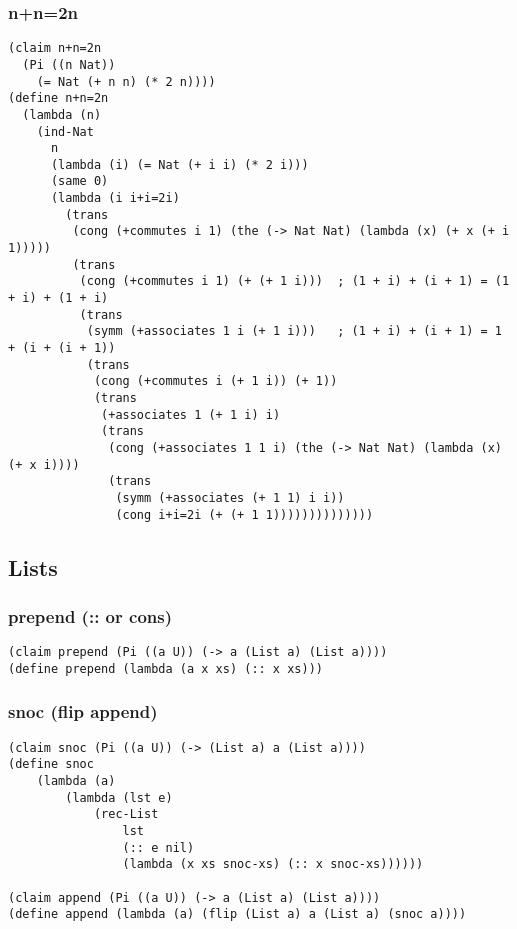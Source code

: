 \subsubsection{n+n=2n} \label{code:n+n=2n}
\begin{lstlisting}
(claim n+n=2n
  (Pi ((n Nat))
    (= Nat (+ n n) (* 2 n))))
(define n+n=2n
  (lambda (n)
    (ind-Nat
      n
      (lambda (i) (= Nat (+ i i) (* 2 i)))
      (same 0)
      (lambda (i i+i=2i)
        (trans
         (cong (+commutes i 1) (the (-> Nat Nat) (lambda (x) (+ x (+ i 1)))))
         (trans
          (cong (+commutes i 1) (+ (+ 1 i)))  ; (1 + i) + (i + 1) = (1 + i) + (1 + i)
          (trans
           (symm (+associates 1 i (+ 1 i)))   ; (1 + i) + (i + 1) = 1 + (i + (i + 1))
           (trans
            (cong (+commutes i (+ 1 i)) (+ 1))
            (trans
             (+associates 1 (+ 1 i) i)
             (trans
              (cong (+associates 1 1 i) (the (-> Nat Nat) (lambda (x) (+ x i))))
              (trans
               (symm (+associates (+ 1 1) i i))
               (cong i+i=2i (+ (+ 1 1))))))))))))))
\end{lstlisting}


\subsection{Lists}

\subsubsection{prepend (:: or cons)} \label{code:prepend}
\begin{lstlisting}
(claim prepend (Pi ((a U)) (-> a (List a) (List a))))
(define prepend (lambda (a x xs) (:: x xs)))
\end{lstlisting}

\subsubsection{snoc (flip append)} \label{code:snoc}
\begin{lstlisting}
(claim snoc (Pi ((a U)) (-> (List a) a (List a))))
(define snoc
    (lambda (a)
        (lambda (lst e)
            (rec-List
                lst
                (:: e nil)
                (lambda (x xs snoc-xs) (:: x snoc-xs))))))

(claim append (Pi ((a U)) (-> a (List a) (List a))))
(define append (lambda (a) (flip (List a) a (List a) (snoc a))))
\end{lstlisting}


